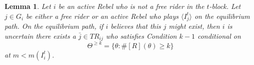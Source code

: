 \documentclass[12pt,letter]{article}
\newtheorem{lemma}{Lemma}[section]
\theoremstyle{definition}
\theoremstyle{remark}
\theoremstyle{claim}
\begin{document}
%
%
%
%

\begin{lemma} Let $i$ be an active Rebel who is not a free rider in the $t$-block. Let $j\in G_i$ be either a free rider or an active Rebel who plays $\langle I^t_j \rangle$ on the equilibrium path. On the equilibrium path, if $i$ believes that this $j$ might exist, then $i$ is uncertain there exists a $\bar{j}\in TR_{ij}$ who satisfies Condition $k-1$ conditional on \[\Theta^{\geq k}=\{\theta:\#[R](\theta)\geq k\}\] at $m<m(I^t_i)$.  
\end{lemma}
\end{document}
